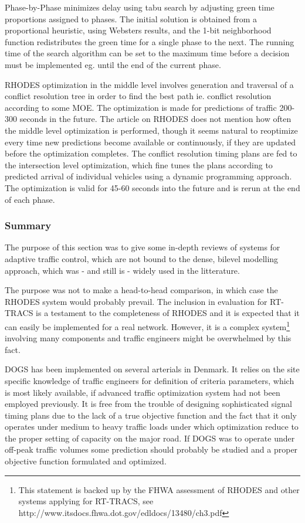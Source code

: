 Phase-by-Phase minimizes delay using tabu search by adjusting green time proportions assigned to phases. The initial solution is obtained from a proportional heuristic, using Websters results, and the 1-bit neighborhood function redistributes the green time for a single phase to the next. 
The running time of the search algorithm can be set to the maximum time before a decision must be implemented eg. until the end of the current phase.

RHODES optimization in the middle level involves generation and traversal of a conflict resolution tree in order to find the best path ie. conflict resolution according to some MOE. The optimization is made for predictions of traffic 200-300 seconds in the future. The article on RHODES does not mention how often the middle level optimization is performed, though it seems natural to reoptimize every time new predictions become available or continuously, if they are updated before the optimization completes.
The conflict resolution timing plans are fed to the intersection level optimization, which fine tunes the plans according to predicted arrival of individual vehicles using a dynamic programming approach. The optimization is valid for 45-60 seconds into the future and is rerun at the end of each phase.

\subsubsection*{Summary}
The purpose of this section was to give some in-depth reviews of systems for adaptive traffic control, which are not bound to the dense, bilevel modelling approach, which was - and still is - widely used in the litterature. 

The purpose was not to make a head-to-head comparison, in which case the RHODES system would probably prevail. The inclusion in evaluation for RT-TRACS is a testament to the completeness of RHODES and it is expected that it can easily be implemented for a real network. However, it is a complex system\footnote{This statement is backed up by the FHWA assessment of RHODES and other systems applying for RT-TRACS, see http://www.itsdocs.fhwa.dot.gov/edldocs/13480/ch3.pdf} involving many components and traffic engineers might be overwhelmed by this fact. 

DOGS has been implemented on several arterials in Denmark. It relies on the site specific knowledge of traffic engineers for definition of criteria parameters, which is most likely available, if advanced traffic optimization system had not been employed previously. It is free from the trouble of designing sophisticated signal timing plans due to the lack of a true objective function and the fact that it only operates under medium to heavy traffic loads under which optimization reduce to the proper setting of capacity on the major road. If DOGS was to operate under off-peak traffic volumes some prediction should probably be studied and a proper objective function formulated and optimized.

